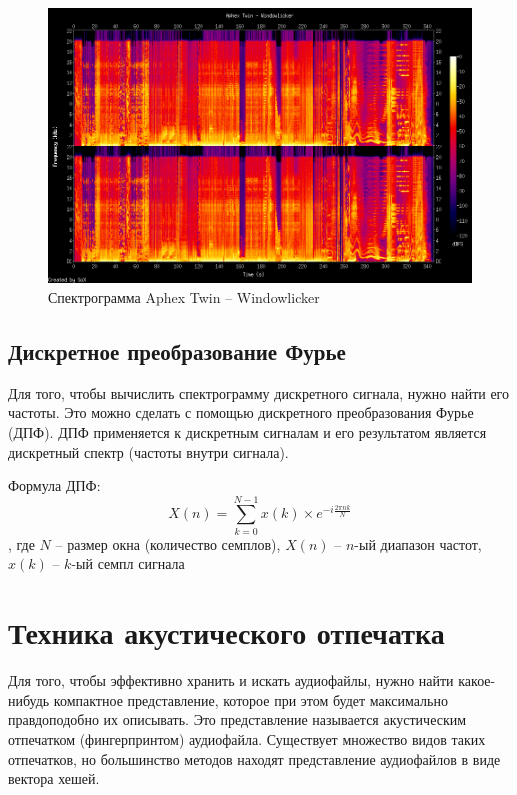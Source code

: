 \begin{figure}[H]
    \begin{center}
        \includegraphics[scale=0.4]{inc/img/windowlicker.png}
        \caption{Спектрограмма Aphex Twin -- Windowlicker}
    \end{center}
\end{figure}

\subsection{Дискретное преобразование Фурье}
Для того, чтобы вычислить спектрограмму дискретного сигнала, нужно найти
его частоты. Это можно сделать с помощью дискретного преобразования Фурье (ДПФ).
ДПФ применяется к дискретным сигналам и его результатом является дискретный спектр (частоты внутри сигнала).

Формула ДПФ:
$$X(n) = \sum_{k=0}^{N-1} x(k) \times e^{-i \frac{2 \pi n k}{N}}$$,
где $N$ -- размер окна (количество семплов),
$X(n)$ -- $n$-ый диапазон частот,
$x(k)$ -- $k$-ый семпл сигнала

\section{Техника акустического отпечатка}
Для того, чтобы эффективно хранить и искать аудиофайлы, нужно
найти какое-нибудь компактное представление, которое при этом будет
максимально правдоподобно их описывать.
Это представление называется акустическим отпечатком (фингерпринтом) аудиофайла.
Существует множество видов таких отпечатков, но большинство методов
находят представление аудиофайлов в виде вектора хешей.


